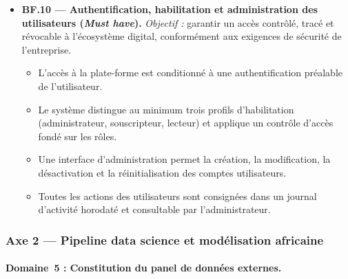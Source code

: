 \documentclass[../main.tex]{subfiles}
\begin{document}
\begin{itemize}[leftmargin=1.5cm, itemsep=6pt]

  \item \textbf{BF.10 --- Authentification, habilitation et administration des utilisateurs (\textit{Must have}).}
  \emph{Objectif :} garantir un accès contrôlé, tracé et révocable à l'écosystème digital, conformément aux exigences de sécurité de l'entreprise.
  \begin{itemize}[label=\textendash, itemsep=2pt]
    \item L'accès à la plate-forme est conditionné à une authentification préalable de l'utilisateur.
    \item Le système distingue au minimum trois profils d'habilitation (administrateur, souscripteur, lecteur) et applique un contrôle d'accès fondé sur les rôles.
    \item Une interface d'administration permet la création, la modification, la désactivation et la réinitialisation des comptes utilisateurs.
    \item Toutes les actions des utilisateurs sont consignées dans un journal d'activité horodaté et consultable par l'administrateur.
  \end{itemize}

\end{itemize}

\subsubsection{Axe 2 --- Pipeline data science et modélisation africaine}

\paragraph{Domaine~5 : Constitution du panel de données externes.}
\end{document}
